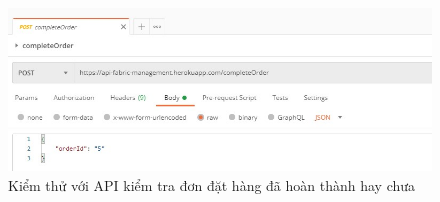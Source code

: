 \begin{figure}[H]
    \begin{center}
        \includegraphics[width=12cm]{Image/API/17_completeOrder.jpg}
        \caption{Kiểm thử với API kiểm tra đơn đặt hàng đã hoàn thành hay chưa}
        \label{completeOrder}
    \end{center}
\end{figure}


